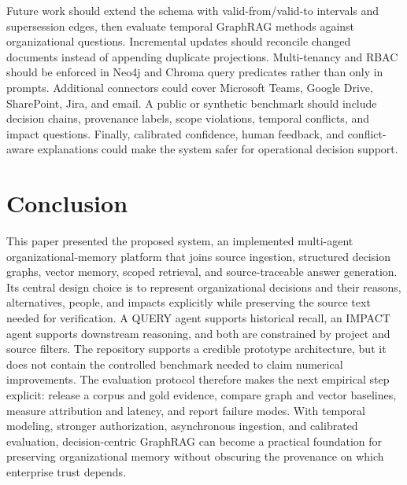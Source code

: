 \documentclass[conference]{IEEEtran}
\newcommand{\system}{the proposed system}
\begin{document}
Future work should extend the schema with valid-from/valid-to intervals and supersession edges, then evaluate temporal GraphRAG methods against organizational questions. Incremental updates should reconcile changed documents instead of appending duplicate projections. Multi-tenancy and RBAC should be enforced in Neo4j and Chroma query predicates rather than only in prompts. Additional connectors could cover Microsoft Teams, Google Drive, SharePoint, Jira, and email. A public or synthetic benchmark should include decision chains, provenance labels, scope violations, temporal conflicts, and impact questions. Finally, calibrated confidence, human feedback, and conflict-aware explanations could make the system safer for operational decision support.

\section{Conclusion}
This paper presented \system, an implemented multi-agent organizational-memory platform that joins source ingestion, structured decision graphs, vector memory, scoped retrieval, and source-traceable answer generation. Its central design choice is to represent organizational decisions and their reasons, alternatives, people, and impacts explicitly while preserving the source text needed for verification. A QUERY agent supports historical recall, an IMPACT agent supports downstream reasoning, and both are constrained by project and source filters. The repository supports a credible prototype architecture, but it does not contain the controlled benchmark needed to claim numerical improvements. The evaluation protocol therefore makes the next empirical step explicit: release a corpus and gold evidence, compare graph and vector baselines, measure attribution and latency, and report failure modes. With temporal modeling, stronger authorization, asynchronous ingestion, and calibrated evaluation, decision-centric GraphRAG can become a practical foundation for preserving organizational memory without obscuring the provenance on which enterprise trust depends.

\balance
\nocite{*}


\end{document}
